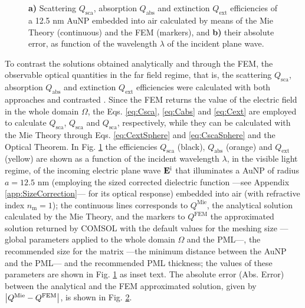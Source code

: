 \begin{figure}[b!]
 \def\svgwidth{.9\textwidth}
 \small
 \centering
    \hspace*{-.95\textwidth}
     \begin{subfigure}{\textwidth}\caption{}\label{fig:Eff:First:a}\end{subfigure}\\[11.5em]
    \hspace*{-.95\textwidth}
     \begin{subfigure}{\textwidth}\caption{}\label{fig:Eff:First:b}\end{subfigure}\\[-15em]
\caption[Scattering, Absorption and Extinction Efficiencies of a 12.5 nm AuNP$@$Air: Analytical and FEM solutions with no optimization]{\textbf{a)} Scattering $Q_\text{sca}$, absorption $Q_\text{abs}$ and extinction $Q_\text{ext}$ efficiencies of a 12.5 nm AuNP embedded into air calculated by means of the Mie Theory (continuous) and the FEM (markers), and \textbf{b)} their absolute error, as function of the wavelength $\lambda$ of the incident plane wave.}
\label{fig:Eff:First}
\end{figure}
%

To contrast the solutions obtained analytically and through the FEM, the observable optical quantities in the far field regime, that is, the scattering $Q_\text{sca}$, absorption $Q_\text{abs}$ and extinction $Q_\text{ext}$ efficiencies were calculated with both approaches and contrasted . Since the FEM returns the value of the electric field in the whole domain $\Omega$, the Eqs. \eqref{eq:Csca}, \eqref{eq:Cabs} and \eqref{eq:Cext} are employed to calculate $Q_\text{sca}$, $Q_\text{sca}$ and $Q_\text{sca}$, respectively, while they can be calculated with the Mie Theory through Eqs. \eqref{eq:CextSphere} and \eqref{eq:CscaSphere} and the Optical Theorem. In Fig. \ref{fig:Eff:First:a} the efficiencies  $Q_\text{sca}$ (black),  $Q_\text{abs}$ (orange) and $Q_\text{ext}$ (yellow) are shown as a function of the incident wavelength $\lambda$, in the visible light regime,  of the incoming electric plane wave $\vb{E}^\text{i}$ that illuminates a AuNP of radius $a = 12.5$ nm (employing the sized corrected dielectric function ---see Appendix \ref{app:SizeCorrection}--- for its optical response) embedded into air (with refractive index $n_\text{m} = 1$); the continuous lines corresponds to $Q^\text{Mie}$, the analytical solution calculated by the Mie Theory, and the markers to $Q^\text{FEM}$ the approximated solution returned by COMSOL with the default values for the meshing size ---global parameters applied to the whole domain $\Omega$ and the PML---, the recommended size for the matrix ---the minimum distance between the AuNP and the PML--- and the recommended PML thickness; the values of these parameters are shown in Fig. \ref{fig:Eff:First:a} as inset text. The absolute error (Abs. Error) between the analytical and the FEM  approximated solution, given by $\abs{Q^\text{Mie}-Q^\text{FEM}}$, is shown in Fig. \ref{fig:Eff:First:b}.

